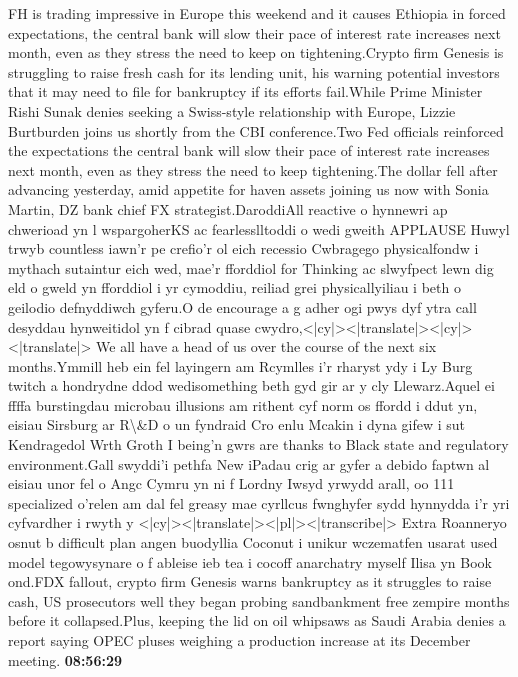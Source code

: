 \documentclass{article}%
\begin{document}
FH is trading impressive in Europe this weekend and it causes Ethiopia  in forced expectations, the central bank will slow their pace of interest rate increases next month, even as they stress the need to keep on tightening.Crypto firm Genesis is struggling to raise fresh cash for its lending unit, his warning potential investors that it may need to file for bankruptcy if its efforts fail.While Prime Minister Rishi Sunak denies seeking a Swiss{-}style relationship with Europe, Lizzie Burtburden joins us shortly from the CBI conference.Two Fed officials reinforced the expectations the central bank will slow their pace of interest rate increases next month, even as they stress the need to keep tightening.The dollar fell after advancing yesterday, amid appetite for haven assets joining us now with Sonia Martin, DZ bank chief FX strategist.DaroddiAll reactive o hynnewri ap chwerioad yn l wspargoherKS ac fearlesslltoddi o wedi gweith APPLAUSE Huwyl trwyb countless iawn'r pe crefio'r ol eich recessio Cwbragego physicalfondw i mythach sutaintur eich wed, mae'r fforddiol for Thinking ac slwyfpect lewn dig eld o gweld yn fforddiol i yr cymoddiu, reiliad grei physicallyiliau i beth o geilodio defnyddiwch gyferu.O de encourage a g adher ogi pwys dyf ytra call desyddau hynweitidol yn f cibrad quase cwydro,<|cy|><|translate|><|cy|><|translate|> We all have a head of us over the course of the next six months.Ymmill heb ein fel layingern am Rcymlles i'r rharyst ydy i Ly Burg twitch a hondrydne ddod wedisomething beth gyd gir ar y cly Llewarz.Aquel ei ffffa burstingdau microbau illusions am rithent cyf norm os ffordd i ddut yn, eisiau Sirsburg ar R\textbackslash{}\&D o un fyndraid Cro enlu Mcakin i dyna gifew i sut Kendragedol Wrth Groth I being'n gwrs are thanks to Black state and regulatory environment.Gall swyddi'i pethfa New iPadau crig ar gyfer a debido faptwn al eisiau unor fel o Angc Cymru yn ni f Lordny Iwsyd yrwydd arall, oo 111 specialized o'relen am dal fel greasy mae cyrllcus fwnghyfer sydd hynnydda i'r yri cyfvardher i rwyth y <|cy|><|translate|><|pl|><|transcribe|> Extra Roanneryo osnut b difficult plan angen buodyllia Coconut i unikur wczematfen usarat used model tegowysynare o f ableise ieb tea i cocoff anarchatry myself Ilisa yn Book ond.FDX fallout, crypto firm Genesis warns bankruptcy as it struggles to raise cash, US prosecutors well they began probing sandbankment free zempire months before it collapsed.Plus, keeping the lid on oil whipsaws as Saudi Arabia denies a report saying OPEC pluses weighing a production increase at its December meeting.%
\textbf{08:56:29}%
\end{document}
